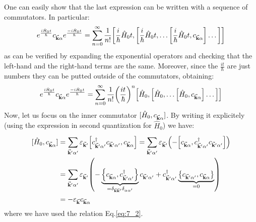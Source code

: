 \documentclass[../main/main.tex]{subfiles}
\begin{document}
One can easily show that the last expression can be written with a sequence of commutators. In particular:
\begin{equation*}
   e^{\frac{i \hat{H}_0 t}{\hbar }}  c_{\va{k}\alpha }
   e^{\frac{- i \hat{H}_0 t}{\hbar }}
   = \sum_{n=0}^{\infty }
   \frac{1}{n!}
   \qty[
   \frac{i}{\hbar }\hat{H}_0 t,
   \qty[ \frac{i}{\hbar } \hat{H}_0 t,
   \dots \qty[
   \frac{i}{\hbar } \hat{H}_0 t,   c_{\va{k}\alpha }
   ] \dots  ]  ]
\end{equation*}
as can be verified by expanding the exponential operators and checking that the left-hand and the right-hand terms are the same.
Moreover, since the \( \frac{i t}{\hbar } \) are just numbers they can be putted outside of the commutators, obtaining:
\begin{equation*}
   e^{\frac{i \hat{H}_0 t}{\hbar }}  c_{\va{k}\alpha }
   e^{\frac{- i \hat{H}_0 t}{\hbar }}
   = \sum_{n=0}^{\infty }
   \frac{1}{n!} \qty(\frac{i t}{\hbar })^n
   \qty[
   \hat{H}_0 ,
   \qty[ \hat{H}_0 ,
   \dots \qty[
   \hat{H}_0 ,   c_{\va{k}\alpha }
   ] \dots  ]  ]
\end{equation*}
Now, let us focus on the inner commutator \( [\hat{H} _0,c_{\va{k}\alpha }] \). By writing it explicitely (using the expression in second quantization for \( \hat{H}_0  \)) we have:
\begin{equation*}
  \begin{split}
  [\hat{H}_0, c_{\va{k}\alpha } ]
  &= \sum_{\va{k}'\alpha'}^{} \varepsilon _{\va{k}'}
  \qty[c_{\va{k}'\alpha'}^\dag c_{\va{k}'\alpha'}, c_{\va{k}\alpha}]
  = \sum_{\va{k}'\alpha'}^{} \varepsilon _{\va{k}'}
  \qty(-\qty[c_{\va{k}\alpha}, c_{\va{k}'\alpha'}^\dag c_{\va{k}'\alpha'}] ) \\
  &=
  \sum_{\va{k}'\alpha'}^{} \varepsilon _{\va{k}'}
  \qty(-
  \underbrace{\qty{ c_{\va{k}\alpha},c_{\va{k}'\alpha'}^\dag
  }}_{= \delta _{\va{k}\va{k}'} \delta _{\alpha \alpha'}}
  c_{\va{k}'\alpha'} + c_{\va{k}'\alpha'}^\dag
  \underbrace{\qty{c_{\va{k}'\alpha'}, c_{\va{k}\alpha}}}_{=0}    ) \\
  &= - \varepsilon _{\va{k}} c_{\va{k}\alpha }
  \end{split}
\end{equation*}
where we have used the relation Eq.\eqref{eq:7_2}.
\end{document}
